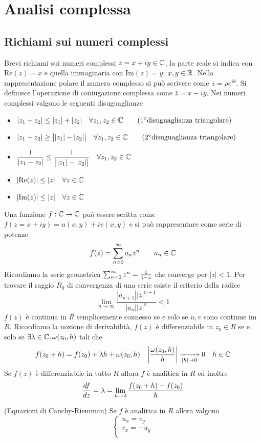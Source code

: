 \chapter{Analisi complessa}
\section{Richiami sui numeri complessi}
Brevi richiami sui numeri complessi $z=x+iy \in \mathbb{C}$, la parte reale si indica con $\text{Re}(z) = x$ e quella immaginaria con $\text{Im}(z) = y$; $x,y\in \mathbb{R}$. Nella rappresentazione polare il numero complesso si può scrivere come $z=\rho e^{i\theta}$. Si definisce l'operazione di coniugazione complessa come $\overline{z} = x-iy$. Nei numeri complessi valgono le seguenti disuguaglianze
\begin{itemize}
\item $|z_1+z_2| \leq |z_1|+|z_2|\quad \forall z_1,z_2\in \mathbb{C}\qquad \text{(1\degree  disuguaglianza triangolare)}$
\item $|z_1-z_2| \geq \big||z_1|-|z_2|\big|\quad \forall z_1,z_2\in \mathbb{C}\qquad \text{(2\degree  disuguaglianza triangolare)}$
\item $\displaystyle\frac{1}{|z_1-z_2| } \leq \frac{1}{\big||z_1|-|z_2|\big|}\quad \forall z_1,z_2\in \mathbb{C}\qquad$
\item $|\text{Re}(z)|\leq |z|\quad \forall z\in \mathbb{C}$
\item $|\text{Im}(z)|\leq |z|\quad \forall z\in \mathbb{C}$
\end{itemize}
Una funzione $f:\mathbb{C}\to\mathbb{C}$ può essere scritta come $f(z=x+iy) = u(x,y)+iv(x,y)$ e si può rappresentare come serie di potenze
\[f(z) = \sum_{n=0}^\infty a_n z^n \qquad a_n\in \mathbb{C}\]
Ricordiamo la serie geometrica $\sum_{n=0}^\infty z^n = \frac{1}{1-z}$ che converge per $|z|<1$. Per trovare il raggio $R_0$ di convergenza di una serie esiste il criterio della radice
\[\lim_{n\to \infty} \frac{|a_{n+1}||z|^{n+1}}{|a_n||z|^n} <1\]
$f(z)$ è continua in $R$ semplicemente connesso se e solo se $u,v$ sono continue im $R$. Ricordiamo la nozione di derivabilità, $f(z)$ è differenziabile in $z_0\in R$ se e solo se $\exists \lambda\in\mathbb{C}, \omega(z_0,h)$ tali che 
\[f(z_0+h) = f(z_0) + \lambda h+\omega(z_0,h)\quad \bigg|\frac{\omega(z_0,h)}{h}\bigg|\xrightarrow[|h|\to 0]{} 0 \quad h\in \mathbb{C}\]
Se $f(z)$ è differenziabile in tutto $R$ allora $f$ è analitica in $R$ ed inoltre
\[\frac{d f}{d z} = \lambda = \lim_{h\to 0}\frac{f(z_0+h)-f(z_0)}{h}\]
\begin{thm}
(Equazioni di Cauchy-Riemman) Se $f$ è analitica in $R$ allora valgono
\[\begin{cases}
    u_x =v_y    \\
   v_x=-u_y\\
  \end{cases} \]
\end{thm}
